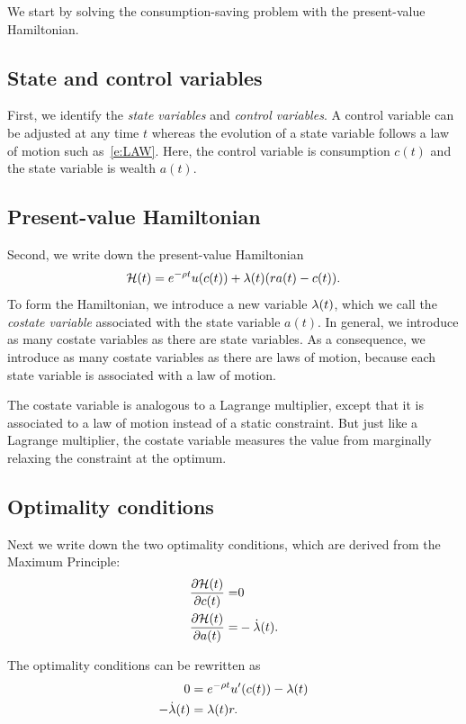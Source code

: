 \documentclass[letterpaper, 11pt, leqno]{article}
\begin{document}
We start by solving the consumption-saving problem with the present-value Hamiltonian.

\subsection{State and control variables}

First, we identify the \textit{state variables} and \textit{control variables}. A control variable can be adjusted at any time $t$ whereas the evolution of a state variable follows a law of motion such as~\eqref{e:LAW}. Here, the control variable is consumption $c(t)$ and the state variable is wealth $a(t)$.

\subsection{Present-value Hamiltonian}

Second, we write down the present-value Hamiltonian
\begin{equation*}
\mathcal{H}(t) = e^{-\rho t} u(c(t)) +\lambda(t) (r a(t) - c(t)).
\end{equation*}
To form the Hamiltonian, we introduce a new variable $\lambda(t)$, which we call the \textit{costate variable} associated with the state variable $a(t)$. In general, we introduce as many costate variables as there are state variables. As a consequence, we introduce as many costate variables as there are laws of motion, because each state variable is associated with a law of motion. 

The costate variable is analogous to a Lagrange multiplier, except that it is associated to a law of motion instead of a static constraint. But just like a Lagrange multiplier, the costate variable measures the value from marginally relaxing the constraint at the optimum.

\subsection{Optimality conditions} 

Next we write down the two optimality conditions, which are derived from the Maximum Principle:
\begin{align}
\pd{\Hc(t)}{c(t)}=& 0 \label{e:foc1}\\
\pd{\Hc(t)}{a(t)}=&-\dot{\l}(t)\label{e:foc2}.
\end{align}

The optimality conditions can be rewritten as
\begin{align}
0 &= e^{-\rho t} u'(c(t)) -\lambda(t)\label{e:focc} \\
-\dot{\lambda}(t)&= \lambda(t) r \label{e:focs}.
\end{align}
\end{document}
